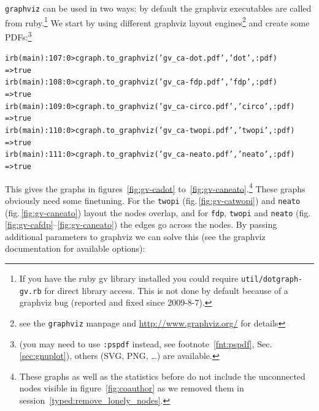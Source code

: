 \documentclass[a4paper]{scrartcl}
\newcounter{tcounter}
\newcommand{\tcount}{\makebox[0pt][r]{\tiny\thetcounter~}}
\newenvironment{typed}{\refstepcounter{tcounter}\bgroup\setlength{\topsep}{0pt}\renewcommand{\FrameCommand}[1]{\fcolorbox{black!30}{bgcolor}{##1}\tcount}\MakeFramed{\FrameRestore}\begin{alltt}\small}{\end{alltt}\endMakeFramed\egroup\par\aftergroup\noindent\aftergroup\ignorespaces}
\newcommand{\file}[1]{\texttt{\color{file}#1}}
\newcommand{\code}[1]{\texttt{\color{code}#1}}
\newcommand{\cmd}[1]{\texttt{\color{cmd}#1}}
\newcommand{\p}{\textcolor{prompt}}
\renewcommand{\c}{\textcolor{cmd}}
\begin{document}
\file{graphviz} can be used in two ways: by default the graphviz
executables are called from ruby.\footnote{If you have the ruby gv library
installed you could require \file{util/dotgraph-gv.rb} for direct
library access. This is not done by default because of a graphviz bug
(reported and fixed since 2009-8-7).}
We start by using
different graphviz layout engines\footnote{see the \file{graphviz} manpage and
\url{http://www.graphviz.org/} for details} and create some PDFs:\footnote{(you may need to use \cmd{:pspdf} instead, see
  footnote~\ref{fnt:pspdf}, Sec.\,\ref{sec:gnuplot}), others
  (SVG, PNG, \dots) are available.}
\begin{typed}
\p{irb(main):107:0>} \c{cgraph.to_graphviz('gv_ca-dot.pdf','dot', :pdf)}
=> true
\p{irb(main):108:0>} \c{cgraph.to_graphviz('gv_ca-fdp.pdf','fdp', :pdf)}
=> true
\p{irb(main):109:0>} \c{cgraph.to_graphviz('gv_ca-circo.pdf','circo', :pdf)}
=> true
\p{irb(main):110:0>} \c{cgraph.to_graphviz('gv_ca-twopi.pdf','twopi', :pdf)}
=> true
\p{irb(main):111:0>} \c{cgraph.to_graphviz('gv_ca-neato.pdf','neato', :pdf)}
=> true
\end{typed}
This gives the graphs in figures~\ref{fig:gv-cadot}
to~\ref{fig:gv-caneato}.\footnote{These graphs as well as the
  statistics before do not include the unconnected nodes visible in
  figure~\ref{fig:coauthor} as we removed them in session~\ref{typed:remove_lonely_nodes}.}  These graphs obviously need some
finetuning. For the \code{twopi} (fig.\,\ref{fig:gv-catwopi}) and
\code{neato} (fig.\,\ref{fig:gv-caneato}) layout the nodes overlap,
and for \code{fdp}, \code{twopi} and \code{neato}
(fig.\,\ref{fig:gv-cafdp}--\ref{fig:gv-caneato}) the edges go across
the nodes. By passing additional parameters to graphviz we can solve
this (see the graphviz documentation for available options):
\end{document}
